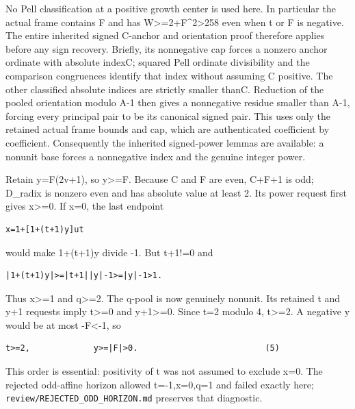 No Pell classification at a positive growth center is used here. In
particular the actual frame contains F and has
W\textgreater=2+F\^{}2\textgreater258 even when t or F is negative. The
entire inherited signed C-anchor and orientation proof therefore applies
before any sign recovery. Briefly, its nonnegative cap forces a nonzero
anchor ordinate with absolute index\textbar C\textbar; squared Pell
ordinate divisibility and the comparison congruences identify that index
without assuming C positive. The other classified absolute indices are
strictly smaller than\textbar C\textbar. Reduction of the pooled
orientation modulo A-1 then gives a nonnegative residue smaller than
\textbar A-1\textbar, forcing every principal pair to be its canonical
signed pair. This uses only the retained actual frame bounds and cap,
which are authenticated coefficient by coefficient. Consequently the
inherited signed-power lemmas are available: a nonunit base forces a
nonnegative index and the genuine integer power.

Retain y=F(2v+1), so \textbar y\textbar\textgreater=\textbar F\textbar.
Because C and F are even, C+F+1 is odd; D\_radix is nonzero even and has
absolute value at least 2. Its power request first gives
x\textgreater=0. If x=0, the last endpoint

\begin{verbatim}
x=1+[1+(t+1)y]ut
\end{verbatim}

would make 1+(t+1)y divide -1. But t+1!=0 and

\begin{verbatim}
|1+(t+1)y|>=|t+1||y|-1>=|y|-1>1.
\end{verbatim}

Thus x\textgreater=1 and \textbar q\textbar\textgreater=2. The q-pool is
now genuinely nonunit. Its retained t and y+1 requests imply
t\textgreater=0 and y+1\textgreater=0. Since t=2 modulo 4,
t\textgreater=2. A negative y would be at most
-\textbar F\textbar\textless-1, so

\begin{verbatim}
t>=2,             y>=|F|>0.                          (5)
\end{verbatim}

This order is essential: positivity of t was not assumed to exclude x=0.
The rejected odd-affine horizon allowed t=-1,x=0,q=1 and failed exactly
here; \nolinkurl{review/REJECTED_ODD_HORIZON.md} preserves that
diagnostic.

